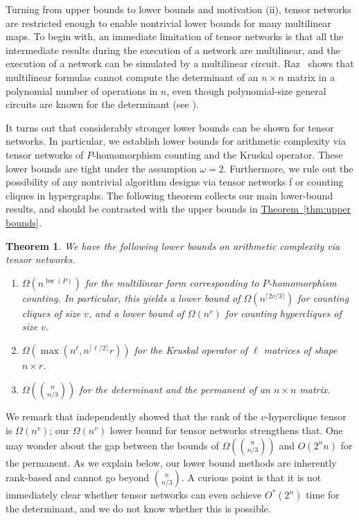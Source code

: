 \documentclass[11pt]{article}
\numberwithin{equation}{section}
\newtheorem{theorem}{Theorem}[section]
\theoremstyle{definition}
\theoremstyle{plain}
\newcommand{\expref}[2]{\hyperref[#2]{#1~\ref{#2}}}
\DeclareMathOperator{\bw}{bw}
\begin{document}
Turning from upper bounds to lower bounds and motivation (ii), tensor
networks are restricted enough to enable nontrivial lower bounds for many
multilinear maps.
To begin with, an immediate limitation of tensor networks is
that all the intermediate results during the execution of a network are
multilinear, and the execution of a network can be simulated by a multilinear
circuit. Raz~\cite{Raz2013} shows that multilinear formulas cannot compute
the
determinant of an $n\times n$ matrix in a polynomial number of operations
in $n$, even though polynomial-size general circuits are known for
the determinant 
%
%
%
(see \cite{Berkowitz1984,BunchH1974,Csanky1976,Rote2001}). 
%

It turns out that considerably stronger lower bounds can be shown
for tensor networks. In particular, we establish
%
%
%
%
lower bounds for arithmetic complexity via tensor
networks of $P$-homomorphism counting and the Kruskal operator.
%
%
%
%
These lower bounds are tight 
%
under the assumption $\omega=2$. %
%
Furthermore, we rule out the possibility of any
nontrivial algorithm designs via tensor networks f
or counting cliques in hypergraphs.
The following theorem collects our main lower-bound results, 
and should be contrasted with the upper bounds
in \expref{Theorem}{thm:upper bounds}.

\begin{theorem}
  \label{thm:lower bounds}
  We have the following lower bounds on arithmetic complexity via tensor networks.  %
  \begin{enumerate}
  \item $\Omega(n^{\bw(P)})$ for the multilinear form corresponding to $P$-homomorphism counting.  In particular, this yields a lower bound of $\Omega(n^{\lceil 2v/3 \rceil})$ for counting cliques of size $v$, and a lower bound of $\Omega(n^v)$ for counting hypercliques of size $v$.
  \item $\Omega(\max(n^\ell, n^{\lceil \ell/2\rceil}r))$ for the Kruskal operator of $\ell$ matrices of shape $n\times r$.
  \item $\Omega(\binom{n}{n/3})$ for the determinant 
%
and the %
permanent of an $n \times n$ matrix.
  \end{enumerate}
\end{theorem}

We remark that \cite{LincolnWW18} independently showed that the rank of the $v$-hyperclique tensor is $\Omega(n^v)$; our $\Omega(n^v)$ lower bound for tensor networks strengthens that.
One may wonder about the gap between the bounds of
$\Omega(\binom{n}{n/3})$ and $O(2^n n)$ for the permanent.
As we explain below, our lower bound methods are inherently rank-based
and cannot go beyond $\binom{n}{n/3}$.  A curious point is that it is 
not immediately clear whether tensor networks can even achieve 
$O^*(2^n)$ time for the determinant, and we do not know whether
%
this is possible.
\end{document}

